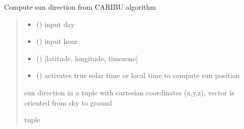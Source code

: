 \documentclass[letterpaper,10pt,english]{sphinxmanual}
\begin{document}

\begin{fulllineitems}
\label{\detokenize{reference:sun.caribu_sun}}
\pysigstartsignatures
{}
\pysigstopsignatures
\sphinxAtStartPar
Compute sun direction from CARIBU algorithm
\begin{quote}\begin{description}
\begin{itemize}
\item {} 
\sphinxAtStartPar
{} () \textendash{} input day

\item {} 
\sphinxAtStartPar
{} () \textendash{} input hour

\item {} 
\sphinxAtStartPar
{} () \textendash{} {[}latitude, longitude, timezone{]}

\item {} 
\sphinxAtStartPar
{} () \textendash{} activates true solar time or local time to compute sun position

\end{itemize}

\sphinxAtStartPar
sun direction in a tuple with cartesian coordinates (x,y,z), vector is oriented from sky to ground

\sphinxAtStartPar
tuple

\end{description}\end{quote}

\end{fulllineitems}

\end{document}

